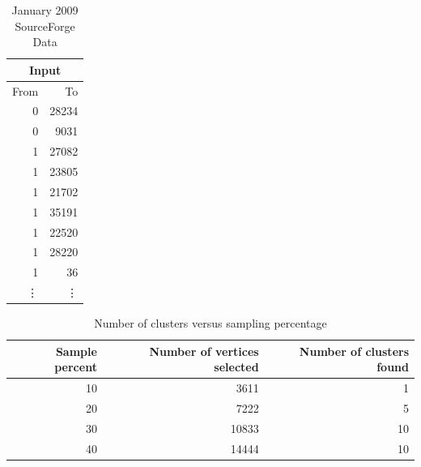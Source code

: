 \begin{table}
\centering
\begin{tabular}{rr}\\ \hline
\multicolumn{2}{c}{Input}\\ \hline
From & To\\ \hline
0 & 28234 \\
0 & 9031 \\
1 & 27082 \\
1 & 23805 \\
1 & 21702 \\
1 & 35191 \\
1 & 22520 \\
1 & 28220 \\
1 & 36 \\
\vdots & \vdots \\ \hline
\end{tabular}
\caption{January 2009 SourceForge Data}
\end{table}

\begin{table}
\centering
\begin{tabular}{rrr}\\ \hline
Sample percent & Number of vertices selected & Number of clusters found\\ \hline
10 & 3611 & 1\\
20 & 7222 & 5\\
30 & 10833 & 10\\
40 & 14444 & 10\\ \hline
\end{tabular}
\caption{Number of clusters versus sampling percentage}
\end{table}


